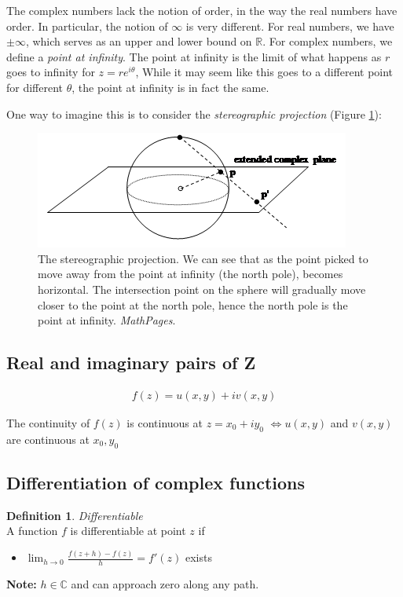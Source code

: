 \documentclass{article}
\theoremstyle{definition}
\newtheorem{definition}{Definition}[section]
\newcommand{\Def}[2]{
\begin{shaded*}
\begin{definition}{\textit{#1}}\\#2\end{definition}
\end{shaded*}
}
\def\R{\mathbb{R}}
\def\C{\mathbb{C}}
\begin{document}
The complex numbers lack the notion of order, in the way the real numbers have order. In particular, the notion of $\infty$ is very different. For real numbers, we have $\pm \infty$, which serves as an upper and lower bound on $\R$. For complex numbers, we define a \textit{point at infinity}. The point at infinity is the limit of what happens as $r$ goes to infinity for $z=r e^{i\theta}$, While it may seem like this goes to a different point for different $\theta$, the point at infinity is in fact the same.

One way to imagine this is to consider the \textit{stereographic projection} (Figure \ref{fig:stereographic}):
\begin{figure}[H]
	\centering
	\includegraphics[width=0.5\linewidth]{stereographic_projection}
	\caption{The stereographic projection. We can see that as the point picked to move away from the point at infinity (the north pole), becomes horizontal. The intersection point on the sphere will gradually move closer to the point at the north pole, hence the north pole is the point at infinity. \textit{MathPages}.}
	\label{fig:stereographic}
\end{figure}


\subsection{Real and imaginary pairs of Z}

\begin{align*}
	f(z) = u(x,y)+iv(x,y)
\end{align*}

The continuity of $f(z)$ is continuous at $z = x_0 + iy_0$ $\iff u(x,y)$ and $v(x,y)$ are continuous at $x_0, y_0$ 

\subsection{Differentiation of complex functions}

\Def{Differentiable}{A function $f$ is differentiable at point $z$ if 
\begin{itemize}
	\item $\lim_{h\to0} \frac{f(z+h) - f(z)}{h} = f'(z)$ exists
\end{itemize}

\textbf{Note:} $h \in \C$ and can approach zero along any path. 
}
\end{document}
